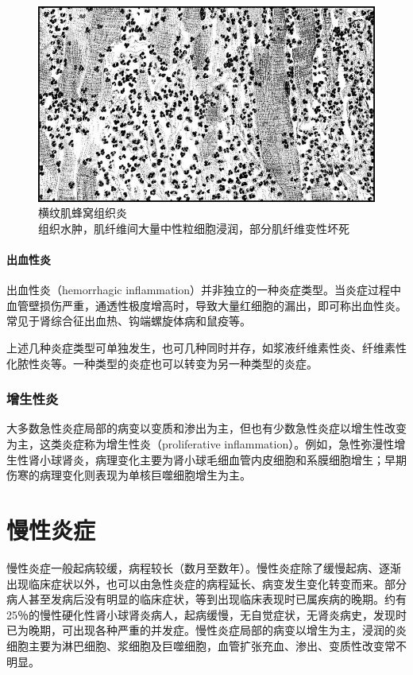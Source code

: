 \begin{figure}[!htbp]
  \centering
  \includegraphics{./images/Image00062.jpg}
  \caption{横纹肌蜂窝组织炎 \\ {\small 组织水肿，肌纤维间大量中性粒细胞浸润，部分肌纤维变性坏死}}
  \label{fig4-11}
\end{figure}



\paragraph{出血性炎}
出血性炎（hemorrhagic
inflammation）并非独立的一种炎症类型。当炎症过程中血管壁损伤严重，通透性极度增高时，导致大量红细胞的漏出，即可称出血性炎。常见于肾综合征出血热、钩端螺旋体病和鼠疫等。

上述几种炎症类型可单独发生，也可几种同时并存，如浆液纤维素性炎、纤维素性化脓性炎等。一种类型的炎症也可以转变为另一种类型的炎症。

\subsubsection{增生性炎}

大多数急性炎症局部的病变以变质和渗出为主，但也有少数急性炎症以增生性改变为主，这类炎症称为增生性炎（proliferative
inflammation）。例如，急性弥漫性增生性肾小球肾炎，病理变化主要为肾小球毛细血管内皮细胞和系膜细胞增生；早期伤寒的病理变化则表现为单核巨噬细胞增生为主。

\section{慢性炎症}

慢性炎症一般起病较缓，病程较长（数月至数年）。慢性炎症除了缓慢起病、逐渐出现临床症状以外，也可以由急性炎症的病程延长、病变发生变化转变而来。部分病人甚至发病后没有明显的临床症状，等到出现临床表现时已属疾病的晚期。约有25％的慢性硬化性肾小球肾炎病人，起病缓慢，无自觉症状，无肾炎病史，发现时已为晚期，可出现各种严重的并发症。慢性炎症局部的病变以增生为主，浸润的炎细胞主要为淋巴细胞、浆细胞及巨噬细胞，血管扩张充血、渗出、变质性改变常不明显。

